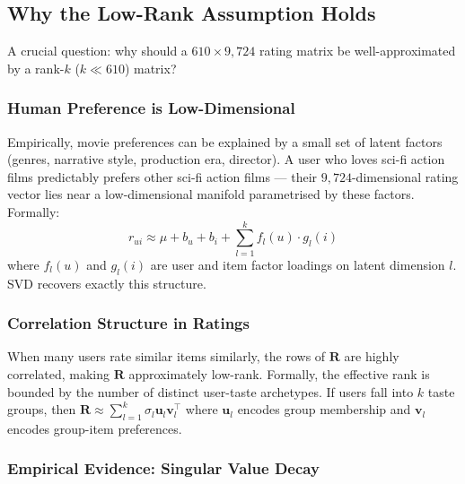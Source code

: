 \documentclass[12pt, a4paper]{article}
\newcommand{\Rmat}{\mathbf{R}}
\begin{document}
\subsection{Why the Low-Rank Assumption Holds}
\label{sec:lowrank}

A crucial question: why should a $610 \times 9{,}724$ rating matrix be
well-approximated by a rank-$k$ ($k \ll 610$) matrix?

\subsubsection{Human Preference is Low-Dimensional}

Empirically, movie preferences can be explained by a small set of
latent factors (genres, narrative style, production era, director).
A user who loves sci-fi action films predictably prefers other
sci-fi action films — their $9{,}724$-dimensional rating vector lies
near a low-dimensional manifold parametrised by these factors.
Formally:
\[
  r_{ui} \approx \mu + b_u + b_i + \sum_{l=1}^{k} f_l(u) \cdot g_l(i)
\]
where $f_l(u)$ and $g_l(i)$ are user and item factor loadings on
latent dimension $l$.  SVD recovers exactly this structure.

\subsubsection{Correlation Structure in Ratings}

When many users rate similar items similarly, the rows of $\Rmat$
are highly correlated, making $\Rmat$ approximately low-rank.
Formally, the effective rank is bounded by the number of distinct
user-taste archetypes.  If users fall into $k$ taste groups, then
$\Rmat \approx \sum_{l=1}^k \sigma_l \mathbf{u}_l \mathbf{v}_l^\top$
where $\mathbf{u}_l$ encodes group membership and $\mathbf{v}_l$
encodes group-item preferences.

\subsubsection{Empirical Evidence: Singular Value Decay}
\end{document}
